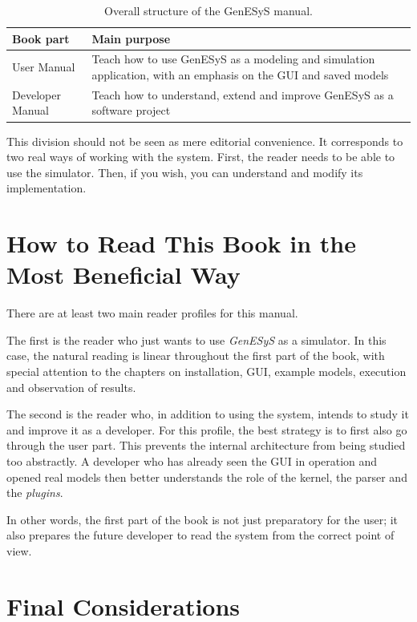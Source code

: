 \begin{table}[htbp]
\centering
 \caption{Overall structure of the GenESyS manual.}
 \label{tab:cap1_estrutura_manual}
\small
 \begin{tabular}{|p{2.8cm}|p{8.0cm}|}
\hline
\textbf{Book part} & \textbf{Main purpose} \\
\hline
User Manual & Teach how to use GenESyS as a modeling and simulation application, with an emphasis on the GUI and saved models \\
\hline
Developer Manual & Teach how to understand, extend and improve GenESyS as a software project \\
\hline
 \end{tabular}
\end{table}

This division should not be seen as mere editorial convenience. It corresponds to two real ways of working with the system. First, the reader needs to be able to use the simulator. Then, if you wish, you can understand and modify its implementation.

\section{How to Read This Book in the Most Beneficial Way}
\label{sec:cap1_como_ler_livro}

There are at least two main reader profiles for this manual.

The first is the reader who just wants to use \textit{GenESyS} as a simulator. In this case, the natural reading is linear throughout the first part of the book, with special attention to the chapters on installation, GUI, example models, execution and observation of results.

The second is the reader who, in addition to using the system, intends to study it and improve it as a developer. For this profile, the best strategy is to first also go through the user part. This prevents the internal architecture from being studied too abstractly. A developer who has already seen the GUI in operation and opened real models then better understands the role of the kernel, the parser and the \textit{plugins}.

In other words, the first part of the book is not just preparatory for the user; it also prepares the future developer to read the system from the correct point of view.

\section{Final Considerations}
\label{sec:cap1_consideracoes_finais}

